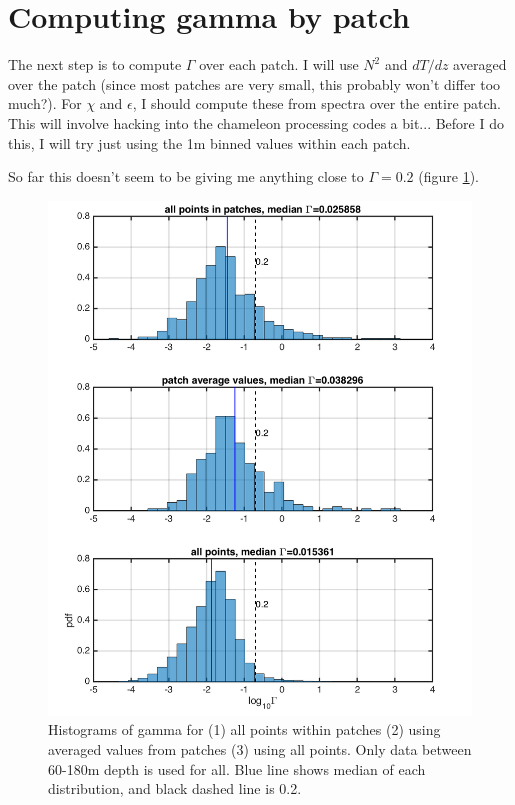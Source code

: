 \documentclass[11pt]{article}
\begin{document}
\clearpage
\section{Computing gamma by patch}

The next step is to compute $\Gamma$ over each patch. I will use $N^2$ and $dT/dz$ averaged over the patch (since most patches are very small, this probably won't differ too much?). For $\chi$ and $\epsilon$, I should compute these from spectra over the entire patch. This will involve hacking into the chameleon processing codes a bit... Before I do this, I will try just using the 1m binned values within each patch.

So far this doesn't seem to be giving me anything close to $\Gamma=0.2$ (figure \ref{hists_gamma_allVspatch}).

\begin{figure}[htbp]
\includegraphics[scale=0.8]{hists_gamma_allVspatch.png}
\caption{Histograms of gamma for (1) all points within patches (2) using averaged values from patches (3) using all points. Only data between 60-180m depth is used for all.  Blue line shows median of each distribution, and black dashed line is 0.2.}
\label{hists_gamma_allVspatch}
\end{figure}
\end{document}
